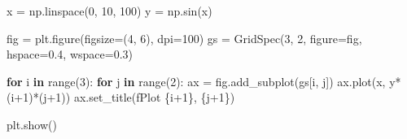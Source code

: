 \documentclass[
  letterpaper,
  DIV=11,
  numbers=noendperiod]{scrreprt}
\newenvironment{Shaded}{\begin{snugshade}}{\end{snugshade}}
\newcommand{\BuiltInTok}[1]{\textcolor[rgb]{0.00,0.23,0.31}{#1}}
\newcommand{\ControlFlowTok}[1]{\textcolor[rgb]{0.00,0.23,0.31}{\textbf{#1}}}
\newcommand{\DecValTok}[1]{\textcolor[rgb]{0.68,0.00,0.00}{#1}}
\newcommand{\FloatTok}[1]{\textcolor[rgb]{0.68,0.00,0.00}{#1}}
\newcommand{\KeywordTok}[1]{\textcolor[rgb]{0.00,0.23,0.31}{\textbf{#1}}}
\newcommand{\NormalTok}[1]{\textcolor[rgb]{0.00,0.23,0.31}{#1}}
\newcommand{\OperatorTok}[1]{\textcolor[rgb]{0.37,0.37,0.37}{#1}}
\newcommand{\SpecialCharTok}[1]{\textcolor[rgb]{0.37,0.37,0.37}{#1}}
\newcommand{\SpecialStringTok}[1]{\textcolor[rgb]{0.13,0.47,0.30}{#1}}
\begin{document}
\begin{Shaded}
\begin{Highlighting}[]
\NormalTok{x }\OperatorTok{=}\NormalTok{ np.linspace(}\DecValTok{0}\NormalTok{, }\DecValTok{10}\NormalTok{, }\DecValTok{100}\NormalTok{)}
\NormalTok{y }\OperatorTok{=}\NormalTok{ np.sin(x)}

\NormalTok{fig }\OperatorTok{=}\NormalTok{ plt.figure(figsize}\OperatorTok{=}\NormalTok{(}\DecValTok{4}\NormalTok{, }\DecValTok{6}\NormalTok{), dpi}\OperatorTok{=}\DecValTok{100}\NormalTok{)}
\NormalTok{gs }\OperatorTok{=}\NormalTok{ GridSpec(}\DecValTok{3}\NormalTok{, }\DecValTok{2}\NormalTok{, figure}\OperatorTok{=}\NormalTok{fig, hspace}\OperatorTok{=}\FloatTok{0.4}\NormalTok{, wspace}\OperatorTok{=}\FloatTok{0.3}\NormalTok{)}

\ControlFlowTok{for}\NormalTok{ i }\KeywordTok{in} \BuiltInTok{range}\NormalTok{(}\DecValTok{3}\NormalTok{):}
    \ControlFlowTok{for}\NormalTok{ j }\KeywordTok{in} \BuiltInTok{range}\NormalTok{(}\DecValTok{2}\NormalTok{):}
\NormalTok{        ax }\OperatorTok{=}\NormalTok{ fig.add\_subplot(gs[i, j])}
\NormalTok{        ax.plot(x, y}\OperatorTok{*}\NormalTok{(i}\OperatorTok{+}\DecValTok{1}\NormalTok{)}\OperatorTok{*}\NormalTok{(j}\OperatorTok{+}\DecValTok{1}\NormalTok{))}
\NormalTok{        ax.set\_title(}\SpecialStringTok{f\textquotesingle{}Plot }\SpecialCharTok{\{}\NormalTok{i}\OperatorTok{+}\DecValTok{1}\SpecialCharTok{\}}\SpecialStringTok{, }\SpecialCharTok{\{}\NormalTok{j}\OperatorTok{+}\DecValTok{1}\SpecialCharTok{\}}\SpecialStringTok{\textquotesingle{}}\NormalTok{)}

\NormalTok{plt.show()}
\end{Highlighting}
\end{Shaded}
\end{document}
